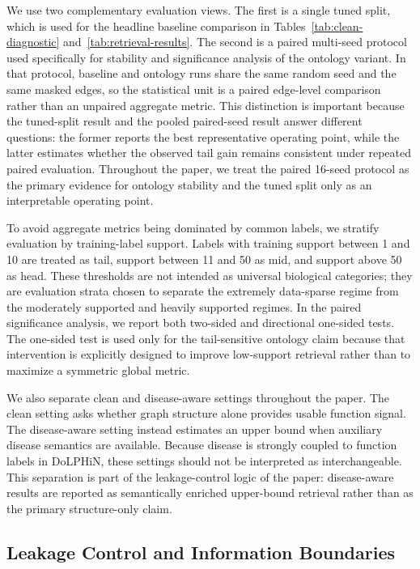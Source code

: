 \documentclass[11pt]{article}
\begin{document}
We use two complementary evaluation views. The first is a single tuned split, which is used for the headline baseline comparison in Tables~\ref{tab:clean-diagnostic} and~\ref{tab:retrieval-results}. The second is a paired multi-seed protocol used specifically for stability and significance analysis of the ontology variant. In that protocol, baseline and ontology runs share the same random seed and the same masked edges, so the statistical unit is a paired edge-level comparison rather than an unpaired aggregate metric. This distinction is important because the tuned-split result and the pooled paired-seed result answer different questions: the former reports the best representative operating point, while the latter estimates whether the observed tail gain remains consistent under repeated paired evaluation. Throughout the paper, we treat the paired 16-seed protocol as the primary evidence for ontology stability and the tuned split only as an interpretable operating point.

To avoid aggregate metrics being dominated by common labels, we stratify evaluation by training-label support. Labels with training support between 1 and 10 are treated as tail, support between 11 and 50 as mid, and support above 50 as head. These thresholds are not intended as universal biological categories; they are evaluation strata chosen to separate the extremely data-sparse regime from the moderately supported and heavily supported regimes. In the paired significance analysis, we report both two-sided and directional one-sided tests. The one-sided test is used only for the tail-sensitive ontology claim because that intervention is explicitly designed to improve low-support retrieval rather than to maximize a symmetric global metric.

We also separate clean and disease-aware settings throughout the paper. The clean setting asks whether graph structure alone provides usable function signal. The disease-aware setting instead estimates an upper bound when auxiliary disease semantics are available. Because disease is strongly coupled to function labels in DoLPHiN, these settings should not be interpreted as interchangeable. This separation is part of the leakage-control logic of the paper: disease-aware results are reported as semantically enriched upper-bound retrieval rather than as the primary structure-only claim.

\subsection{Leakage Control and Information Boundaries}
\label{sec:leakage-control}
\end{document}
